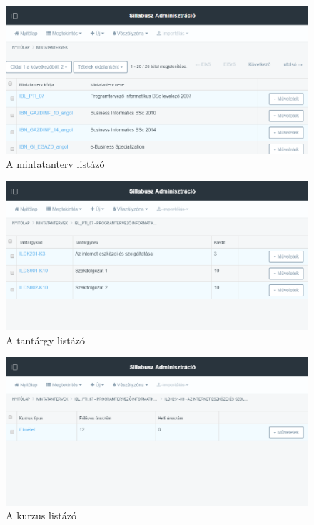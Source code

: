 \documentclass[hidelinks, 12pt, a4paper]{report}
\begin{document}
\begin{figure}[H]
    \centering
	\includegraphics[width=\textwidth]{sm_curriculum_list.png}
	\caption{A mintatanterv listázó}
\end{figure}

\begin{figure}[H]
    \centering
	\includegraphics[width=\textwidth]{sm_subject_list.png}
	\caption{A tantárgy listázó}
\end{figure}

\begin{figure}[H]
    \centering
	\includegraphics[width=\textwidth]{sm_course_list.png}
	\caption{A kurzus listázó}
\end{figure}
\end{document}
